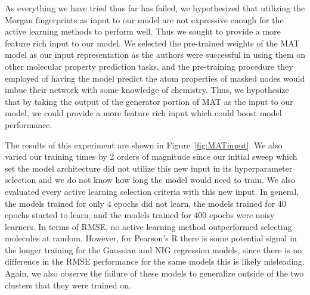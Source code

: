 \documentclass[journal=jmcmar,manuscript=article]{achemso}
\begin{document}
As everything we have tried thus far has failed, we hypothesized that utilizing the Morgan fingerprints as input to our model are not expressive enough for the active learning methods to perform well. Thus we sought to provide a more feature rich input to our model. We selected the pre-trained weights of the MAT\cite{MAT} model as our input representation as the authors were successful in using them on other molecular property prediction tasks, and the pre-training procedure they employed of having the model predict the atom properties of masked nodes would imbue their network with some knowledge of chemistry. Thus, we hypothesize that by taking the output of the generator portion of MAT as the input to our model, we could provide a more feature rich input which could boost model performance.

The results of this experiment are shown in Figure~\ref{fig:MATinput}. We also varied our training times by 2 orders of magnitude since our initial sweep which set the model architecture did not utilize this new input in its hyperparameter selection and we do not know how long the model would need to train. We also evaluated every active learning selection criteria with this new input. In general, the models trained for only 4 epochs did not learn, the models trained for 40 epochs started to learn, and the models trained for 400 epochs were noisy learners. In terms of RMSE, no active learning method outperformed selecting molecules at random. However, for Pearson's R there is some potential signal in the longer training for the Gaussian and NIG regression models, since there is no difference in the RMSE performance for the same models this is likely misleading. Again, we also observe the failure of these models to generalize outside of the two clusters that they were trained on.
\end{document}

